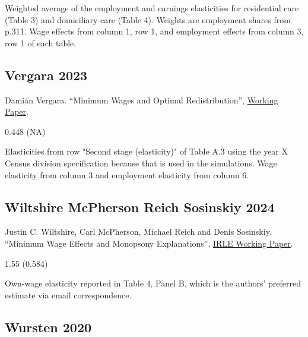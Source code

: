  Weighted average of the employment and earnings elasticities for residential care (Table 3) and domiciliary care (Table 4). Weights are employment shares from p.311. Wage effects from column 1, row 1, and employment effects from column 3, row 1 of each table.

\subsection*{Vergara 2023}
\vspace{-0.7em}

\noindent Damián Vergara. ``Minimum Wages and Optimal Redistribution'', \href{https://dvergarad.github.io/files/JMP_DV.pdf}{Working Paper}.

\vspace{0.7em}

 0.448 (NA)

\vspace{0.7em}

 Elasticities from row "Second stage (elasticity)" of Table A.3 using the year X Census division specification because that is used in the simulations. Wage elasticity from column 3 and employment elasticity from column 6.

\subsection*{Wiltshire McPherson Reich Sosinskiy 2024}
\vspace{-0.7em}

\noindent Justin C. Wiltshire, Carl McPherson, Michael Reich and Denis Sosinskiy. ``Minimum Wage Effects and Monopsony Explanations'', \href{https://irle.berkeley.edu/wp-content/uploads/2023/09/minimum-wage-effects-and-monopsony-explanations-augustREVISED.pdf}{IRLE Working Paper}.

\vspace{0.7em}

 1.55 (0.584)

\vspace{0.7em}

 Own-wage elasticity reported in Table 4, Panel B, which is the authors' preferred estimate via email correspondence.

\subsection*{Wursten 2020}
\vspace{-0.7em}

